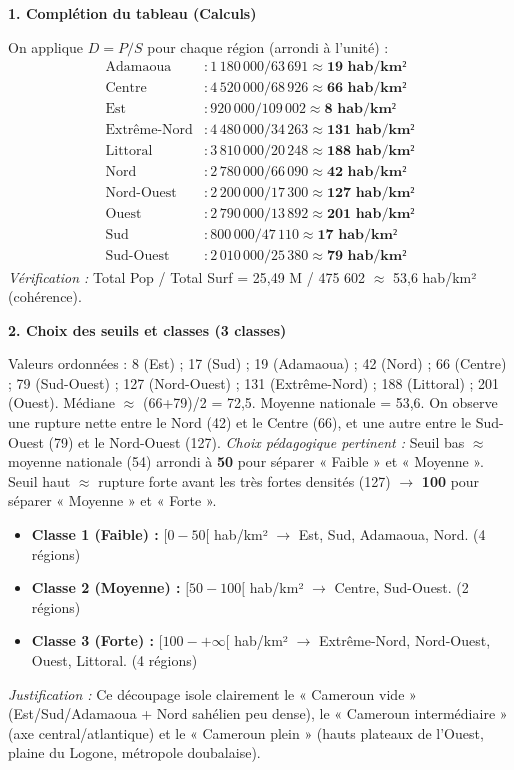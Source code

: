 \documentclass[11pt]{article}
\newcounter{popsec}
\newcounter{popsub}
\newcommand{\courssub}[1]{%
  \stepcounter{popsub}%
  \par\vspace{9pt}\noindent{\popxbold\fontsize{11.5}{13}\selectfont\color{popink}{\color{poporange}\thepopsec.\thepopsub}\hspace{6pt}#1}\par\nopagebreak\vspace{4pt}
}
\begin{document}
\courssub{Démarche et corrigé commenté}
\begin{exoresolu}
\textbf{1. Complétion du tableau (Calculs)}

On applique $D = P / S$ pour chaque région (arrondi à l'unité) :
\begin{align*}
\text{Adamaoua} &: 1\,180\,000 / 63\,691 \approx \textbf{19 hab/km²} \\
\text{Centre} &: 4\,520\,000 / 68\,926 \approx \textbf{66 hab/km²} \\
\text{Est} &: 920\,000 / 109\,002 \approx \textbf{8 hab/km²} \\
\text{Extrême-Nord} &: 4\,480\,000 / 34\,263 \approx \textbf{131 hab/km²} \\
\text{Littoral} &: 3\,810\,000 / 20\,248 \approx \textbf{188 hab/km²} \\
\text{Nord} &: 2\,780\,000 / 66\,090 \approx \textbf{42 hab/km²} \\
\text{Nord-Ouest} &: 2\,200\,000 / 17\,300 \approx \textbf{127 hab/km²} \\
\text{Ouest} &: 2\,790\,000 / 13\,892 \approx \textbf{201 hab/km²} \\
\text{Sud} &: 800\,000 / 47\,110 \approx \textbf{17 hab/km²} \\
\text{Sud-Ouest} &: 2\,010\,000 / 25\,380 \approx \textbf{79 hab/km²}
\end{align*}
\textit{Vérification :} Total Pop / Total Surf = 25,49 M / 475 602 $\approx$ 53,6 hab/km² (cohérence).

\textbf{2. Choix des seuils et classes (3 classes)}

Valeurs ordonnées : 8 (Est) ; 17 (Sud) ; 19 (Adamaoua) ; 42 (Nord) ; 66 (Centre) ; 79 (Sud-Ouest) ; 127 (Nord-Ouest) ; 131 (Extrême-Nord) ; 188 (Littoral) ; 201 (Ouest).
Médiane $\approx$ (66+79)/2 = 72,5. Moyenne nationale = 53,6.
On observe une rupture nette entre le Nord (42) et le Centre (66), et une autre entre le Sud-Ouest (79) et le Nord-Ouest (127).
\emph{Choix pédagogique pertinent :} Seuil bas $\approx$ moyenne nationale (54) arrondi à \textbf{50} pour séparer « Faible » et « Moyenne ». Seuil haut $\approx$ rupture forte avant les très fortes densités (127) $\to$ \textbf{100} pour séparer « Moyenne » et « Forte ».
\begin{itemize}
    \item \textbf{Classe 1 (Faible) :} $[0 - 50[$ hab/km² $\to$ Est, Sud, Adamaoua, Nord. (4 régions)
    \item \textbf{Classe 2 (Moyenne) :} $[50 - 100[$ hab/km² $\to$ Centre, Sud-Ouest. (2 régions)
    \item \textbf{Classe 3 (Forte) :} $[100 - +\infty[$ hab/km² $\to$ Extrême-Nord, Nord-Ouest, Ouest, Littoral. (4 régions)
\end{itemize}
\emph{Justification :} Ce découpage isole clairement le « Cameroun vide » (Est/Sud/Adamaoua + Nord sahélien peu dense), le « Cameroun intermédiaire » (axe central/atlantique) et le « Cameroun plein » (hauts plateaux de l'Ouest, plaine du Logone, métropole doubalaise).


\end{exoresolu}
\end{document}
